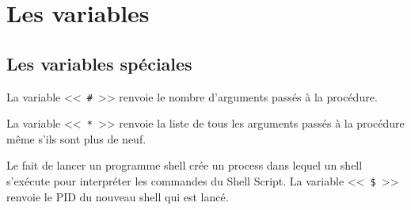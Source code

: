 %
%

\setcounter{remarque-cnt}{1}
\setcounter{example-cnt}{1}
\chapter{Les variables}
\thispagestyle{fancy}

\section{\label{variables-special-var}Les variables sp{\'e}ciales}

La variable <<~\verb=#=~>>  renvoie le
nombre d'arguments pass{\'e}s {\`a} la proc{\'e}dure.

La variable <<~\verb=*=~>> renvoie la liste
de tous les arguments pass{\'e}s {\`a} la proc{\'e}dure m{\^e}me s'ils
sont plus de neuf.

Le fait de lancer un programme shell cr{\'e}e un process dans lequel un
shell s'ex{\'e}cute pour interpr{\'e}ter les commandes du Shell Script.
La variable <<~\texttt{\$}~>> renvoie le PID
du nouveau shell qui est lanc{\'e}.

